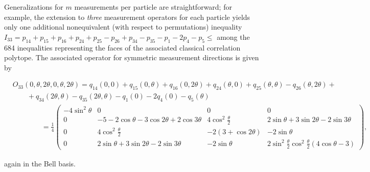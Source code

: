 \documentclass[prl,showpacs,showkeys,amsfonts,amsmath,twocolumn]{revtex4}
\newcommand{\ket}[1]{|#1\rangle}
\begin{document}
Generalizations for $m$ measurements per particle are
straightforward;
for example, the extension to \emph{three} measurement operators for each particle
yields only one additional nonequivalent (with respect to permutations)
inequality \cite{2000-poly,collins-gisin-2003,sliwa-2003}
$I_{33}=p_{14} + p_{15} + p_{16} + p_{24} + p_{25} - p_{26} + p_{34} - p_{35}
- p_{1} - 2 p_{4} - p_{5} \leq$ among the 684 inequalities representing the
 faces of the associated classical correlation polytope.
The associated operator for symmetric
measurement directions is given by
\begin{widetext}
\begin{equation}
\begin{array}{lll}
&O_{33}(0,\theta,2\theta,0,\theta,2\theta)= q_{14}(0,0) + q_{15}(0,\theta) + q_{16}(0,2\theta) + q_{24}(\theta,0) +
q_{25}(\theta,\theta) - q_{26}(\theta,2\theta) +\\
&\qquad  + q_{34}(2\theta,\theta)- q_{35}(2\theta,\theta)-q_{1}(0) - 2 q_{4}(0) - q_{5}(\theta) \\
&\qquad \qquad =\frac{1}{4}\left(
\begin{smallmatrix}
-4\sin^2\theta & 0 & 0 & 0\\
0 & -5-2\cos\theta - 3\cos 2\theta + 2\cos 3\theta &
4\cos^2\frac{\theta}{2} & 2\sin\theta + 3 \sin 2\theta - 2 \sin
3\theta\\
0 & 4\cos^2\frac{\theta}{2} & -2(3+\cos 2\theta) & - 2\sin\theta \\
0 &  2\sin\theta + 3 \sin 2\theta - 2 \sin 3\theta & - 2\sin\theta &
2\sin^2\frac{\theta}{2}\cos^2\frac{\theta}{2}(4\cos\theta -3)
\end{smallmatrix}\right),
\end{array}
\label{2004-qbounds-e5}
\end{equation}
\end{widetext}
again in the Bell basis.
\end{document}
